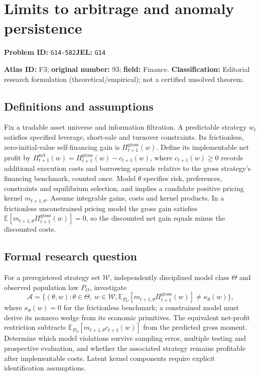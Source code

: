 \documentclass[11pt,a4paper]{article}
\begin{document}
\section*{Limits to arbitrage and anomaly persistence}
\textbf{Problem ID:} \texttt{G14-582}\quad \textbf{JEL:} \texttt{G14}\par
\label{problem:OP-0093}
\label{atlas:prob:F3}

\noindent\textbf{Atlas ID:} F3; \textbf{original number:} 93; \textbf{field:} Finance. \textbf{Classification:} Editorial research formulation (theoretical/empirical); not a certified unsolved theorem.

\subsection*{Definitions and assumptions}
Fix a tradable asset universe and information filtration. A predictable strategy $w_t$ satisfies specified leverage, short-sale and turnover constraints. Its frictionless, zero-initial-value self-financing gain is $\Pi^{\mathrm{gross}}_{t+1}(w)$. Define its implementable net profit by $\Pi^{\mathrm{net}}_{t+1}(w)=\Pi^{\mathrm{gross}}_{t+1}(w)-c_{t+1}(w)$, where $c_{t+1}(w)\ge0$ records additional execution costs and borrowing spreads relative to the gross strategy's financing benchmark, counted once. Model $\theta$ specifies risk, preferences, constraints and equilibrium selection, and implies a candidate positive pricing kernel $m_{t+1,\theta}$. Assume integrable gains, costs and kernel products. In a frictionless unconstrained pricing model the gross gain satisfies $\mathbb E[m_{t+1,\theta}\Pi^{\mathrm{gross}}_{t+1}(w)]=0$, so the discounted net gain equals minus the discounted costs.

\subsection*{Formal research question}
For a preregistered strategy set $\mathcal W$, independently disciplined model class $\Theta$ and observed population law $P_O$, investigate
\[
 \mathcal A=\{(\theta,w):\theta\in\Theta,\ w\in\mathcal W,
  \mathbb E_{P_O}[m_{t+1,\theta}\Pi^{\mathrm{gross}}_{t+1}(w)]
   \ne\kappa_\theta(w)\},
\]
where $\kappa_\theta(w)=0$ for the frictionless benchmark; a constrained model must derive its nonzero wedge from its economic primitives. The equivalent net-profit restriction subtracts $\mathbb E_{P_O}[m_{t+1,\theta}c_{t+1}(w)]$ from the predicted gross moment. Determine which model violations survive sampling error, multiple testing and prospective evaluation, and whether the associated strategy remains profitable after implementable costs. Latent kernel components require explicit identification assumptions.
\end{document}
